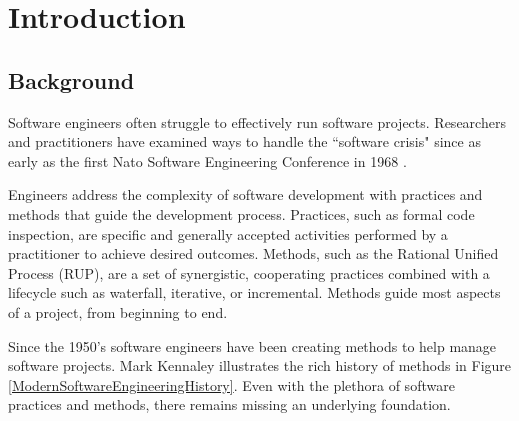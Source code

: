 \documentclass[preprint,12pt,3p]{elsarticle}
\begin{document}
\begin{frontmatter}
\begin{abstract}

\end{abstract}


\end{frontmatter}


\section{Introduction}

\subsection{Background}
Software engineers often struggle to effectively run software projects. Researchers and practitioners have examined ways to handle the ``software crisis" since as early as the first Nato Software Engineering Conference in 1968 \cite{Naur1969}. 

Engineers address the complexity of software development with practices and methods that guide the development process. Practices, such as formal code inspection, are specific and generally accepted activities performed by a practitioner to achieve desired outcomes. Methods, such as the Rational Unified Process (RUP), are a set of synergistic, cooperating practices combined with a lifecycle such as waterfall, iterative, or incremental. Methods guide most aspects of a project, from beginning to end.

Since the 1950's software engineers have been creating methods to help manage software projects. Mark Kennaley illustrates the rich history of methods \cite{SDLC, ValueStream} in Figure \ref{ModernSoftwareEngineeringHistory}. Even with the plethora of software practices and methods, there remains missing an underlying foundation.
\end{document}
